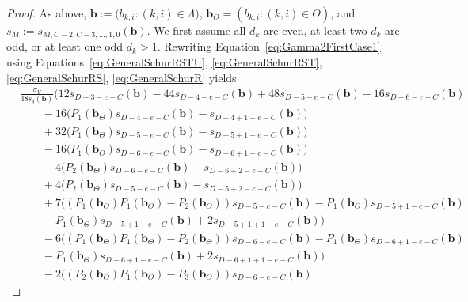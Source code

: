 \documentclass{amsart}
\theoremstyle{definition}
\theoremstyle{remark}
\newcommand{\bs}{\boldsymbol}
\begin{document}
\begin{proof}
As above, $\bs{b} := \big(b_{k,i} : (k,i)\in\Lambda\big)$,
$\bs{b}_\Theta = (b_{k,i} : (k,i)\in\Theta)$,
and $s_M := s_{M,C-2,C-3, \ldots, 1, 0}(\bs{b})$.
We first assume all $d_k$ are even, at least two $d_k$ are odd, or at least
one odd $d_k > 1$.
Rewriting Equation~\eqref{eq:Gamma2FirstCase1} using
Equations~\eqref{eq:GeneralSchurRSTU}, \eqref{eq:GeneralSchurRST},
\eqref{eq:GeneralSchurRS}, \eqref{eq:GeneralSchurR} yields
\begin{align*}
            &\frac{\sigma_V}{48 s_\delta(\bs{b})}\Big(
                12 s_{D-3-e-C}(\bs{b}) - 44 s_{D-4-e-C}(\bs{b}) + 48 s_{D-5-e-C}(\bs{b})- 16 s_{D-6-e-C}(\bs{b})
            \\ &\quad\quad
                - 16 \big(P_1(\bs{b}_\Theta) s_{D-4-e-C}(\bs{b})
                - s_{D-4+1-e-C}(\bs{b})\big)
            \\ &\quad\quad
                + 32 \big(P_1(\bs{b}_\Theta) s_{D-5-e-C}(\bs{b}) - s_{D-5+1-e-C}(\bs{b})\big)
            \\ &\quad\quad
                - 16 \big(P_1(\bs{b}_\Theta) s_{D-6-e-C}(\bs{b}) - s_{D-6+1-e-C}(\bs{b})\big)
            \\ &\quad\quad
                - 4 \big(P_2(\bs{b}_\Theta) s_{D-6-e-C}(\bs{b}) - s_{D-6+2-e-C}(\bs{b})\big)
            \\ &\quad\quad
                + 4 \big(P_2(\bs{b}_\Theta) s_{D-5-e-C}(\bs{b}) - s_{D-5+2-e-C}(\bs{b})\big)
            \\ &\quad\quad
                + 7 \big( (P_1(\bs{b}_\Theta) P_1(\bs{b}_\Theta)
                    - P_{2}(\bs{b}_\Theta)) s_{D-5 - e - C}(\bs{b})
                    - P_1(\bs{b}_\Theta) s_{D - 5 + 1 - e - C}(\bs{b})
            \\ &\quad\quad
                    - P_1(\bs{b}_\Theta) s_{D - 5 + 1 - e - C}(\bs{b})
                    + 2 s_{D - 5 + 1 + 1 - e - C}(\bs{b})\big)
            \\ &\quad\quad
                - 6 \big( (P_1(\bs{b}_\Theta) P_1(\bs{b}_\Theta)
                - P_2(\bs{b}_\Theta))s_{D - 6 - e - C}(\bs{b})
                    - P_1(\bs{b}_\Theta) s_{D - 6 + 1 - e - C}(\bs{b})
            \\ &\quad\quad
                    - P_1(\bs{b}_\Theta) s_{D - 6 + 1 - e - C}(\bs{b})
                    + 2 s_{D - 6 + 1 + 1 - e - C}(\bs{b}) \big)
            \\ &\quad\quad
                - 2 \big( (P_2(\bs{b}_\Theta) P_1(\bs{b}_\Theta)
                    - P_3(\bs{b}_\Theta))s_{D - 6 - e - C}(\bs{b})

\end{align*}
\end{proof}
\end{document}
